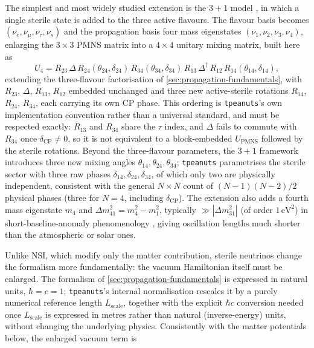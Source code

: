 The simplest and most widely studied extension is the \(3+1\) model \parencite{Kopp2013,GiuntiLasserre2019}, in which a single sterile state is added to the three active flavours. The flavour basis becomes \((\nu_e,\nu_\mu,\nu_\tau,\nu_s)\) and the propagation basis four mass eigenstates \((\nu_1,\nu_2,\nu_3,\nu_4)\), enlarging the \(3\times3\) PMNS matrix into a \(4\times4\) unitary mixing matrix, built here as
\begin{equation}
  U_4 = R_{23}\,\Delta\,R_{24}(\theta_{24},\delta_{24})\,R_{34}(\theta_{34},\delta_{34})\,R_{13}\,\Delta^{\dagger}\,R_{12}\,R_{14}(\theta_{14},\delta_{14}),
\end{equation}
extending the three-flavour factorisation of \cref{sec:propagation-fundamentals}, with \(R_{23}\), \(\Delta\), \(R_{13}\), \(R_{12}\) embedded unchanged and three new active-sterile rotations \(R_{14}\), \(R_{24}\), \(R_{34}\), each carrying its own CP phase. This ordering is \texttt{tpeanuts}'s own implementation convention rather than a universal standard, and must be respected exactly: \(R_{13}\) and \(R_{34}\) share the \(\tau\) index, and \(\Delta\) fails to commute with \(R_{34}\) once \(\delta_{\mathrm{CP}}\neq0\), so it is not equivalent to a block-embedded \(U_{\mathrm{PMNS}}\) followed by the sterile rotations. Beyond the three-flavour parameters, the \(3+1\) framework introduces three new mixing angles \(\theta_{14},\theta_{24},\theta_{34}\); \texttt{tpeanuts} parametrises the sterile sector with three raw phases \(\delta_{14},\delta_{24},\delta_{34}\), of which only two are physically independent, consistent with the general \(N\times N\) count of \((N-1)(N-2)/2\) physical phases (three for \(N=4\), including \(\delta_{\mathrm{CP}}\)). The extension also adds a fourth mass eigenstate \(m_4\) and \(\Delta m_{41}^2=m_4^2-m_1^2\), typically \(\gg|\Delta m_{31}^2|\) (of order \(1\,\mathrm{eV}^2\)) in short-baseline-anomaly phenomenology \parencite{Kopp2013}, giving oscillation lengths much shorter than the atmospheric or solar ones.

Unlike NSI, which modify only the matter contribution, sterile neutrinos change the formalism more fundamentally: the vacuum Hamiltonian itself must be enlarged. The formalism of \cref{sec:propagation-fundamentals} is expressed in natural units, \(\hbar=c=1\); \texttt{tpeanuts}'s internal normalisation rescales it by a purely numerical reference length \(L_{\mathrm{scale}}\), together with the explicit \(\hbar c\) conversion needed once \(L_{\mathrm{scale}}\) is expressed in metres rather than natural (inverse-energy) units, without changing the underlying physics. Consistently with the matter potentials below, the enlarged vacuum term is

